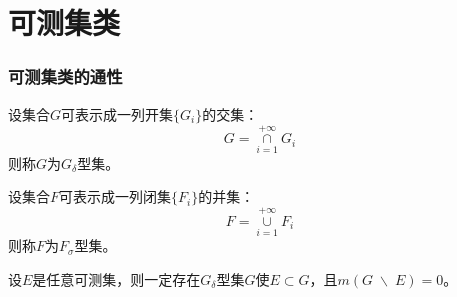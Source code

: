 \section{可测集类}

\subsubsection{可测集类的通性}
\begin{definition}
	设集合$G$可表示成一列开集$\{G_i\}$的交集：
	\begin{equation*}
		G=\underset{i=1}{\overset{+\infty}{\cap}}G_i
	\end{equation*}
	则称$G$为$G_\delta$型集。
\end{definition}
\begin{definition}
	设集合$F$可表示成一列闭集$\{F_i\}$的并集：
	\begin{equation*}
		F=\underset{i=1}{\overset{+\infty}{\cup}}F_i
	\end{equation*}
	则称$F$为$F_\sigma$型集。
\end{definition}
\begin{theorem}
	设$E$是任意可测集，则一定存在$G_\delta$型集$G$使$E\subset G$，且$m(G\;\backslash\; E)=0$。
\end{theorem}

